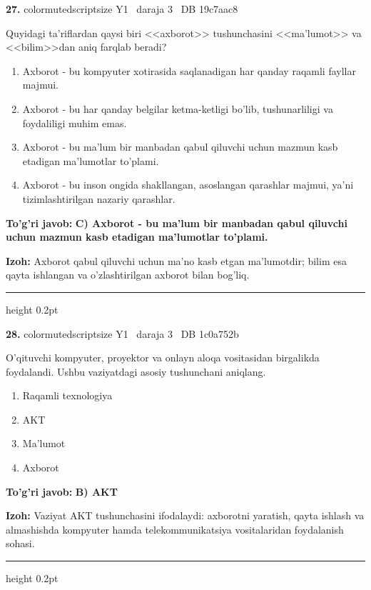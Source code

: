 \documentclass[10pt,a4paper,oneside]{article}
\begin{document}
\noindent\textbf{\color{ink}27.}  {color{muted}scriptsize Y1 \textbullet\ daraja 3 \textbullet\ DB 19c7aac8}
\par
Quyidagi ta'riflardan qaysi biri <<axborot>> tushunchasini <<ma'lumot>> va <<bilim>>dan aniq farqlab beradi?
\begin{enumerate}[label=\Alph*),leftmargin=9mm]
\item Axborot - bu kompyuter xotirasida saqlanadigan har qanday raqamli fayllar majmui.
\item Axborot - bu har qanday belgilar ketma-ketligi bo'lib, tushunarliligi va foydaliligi muhim emas.
\item Axborot - bu ma'lum bir manbadan qabul qiluvchi uchun mazmun kasb etadigan ma'lumotlar to'plami.
\item Axborot - bu inson ongida shakllangan, asoslangan qarashlar majmui, ya'ni tizimlashtirilgan nazariy qarashlar.
\end{enumerate}
\begin{tcolorbox}[enhanced,breakable,colback=teal!4,colframe=teal!50!black,boxrule=0.5pt,arc=1.1mm,left=3mm,right=3mm,top=1.7mm,bottom=1.7mm,before skip=2mm,after skip=2mm]
\textbf{\color{teal}To'g'ri javob:} \textbf{C) Axborot - bu ma'lum bir manbadan qabul qiluvchi uchun mazmun kasb etadigan ma'lumotlar to'plami.}
\par\smallskip
\textbf{Izoh:} Axborot qabul qiluvchi uchun ma'no kasb etgan ma'lumotdir; bilim esa qayta ishlangan va o'zlashtirilgan axborot bilan bog'liq.
\end{tcolorbox}
\vspace{2mm}\hrule height 0.2pt \vspace{3mm}

\noindent\textbf{\color{ink}28.}  {color{muted}scriptsize Y1 \textbullet\ daraja 3 \textbullet\ DB 1c0a752b}
\par
O'qituvchi kompyuter, proyektor va onlayn aloqa vositasidan birgalikda foydalandi. Ushbu vaziyatdagi asosiy tushunchani aniqlang.
\begin{enumerate}[label=\Alph*),leftmargin=9mm]
\item Raqamli texnologiya
\item AKT
\item Ma'lumot
\item Axborot
\end{enumerate}
\begin{tcolorbox}[enhanced,breakable,colback=teal!4,colframe=teal!50!black,boxrule=0.5pt,arc=1.1mm,left=3mm,right=3mm,top=1.7mm,bottom=1.7mm,before skip=2mm,after skip=2mm]
\textbf{\color{teal}To'g'ri javob:} \textbf{B) AKT}
\par\smallskip
\textbf{Izoh:} Vaziyat AKT tushunchasini ifodalaydi: axborotni yaratish, qayta ishlash va almashishda kompyuter hamda telekommunikatsiya vositalaridan foydalanish sohasi.
\end{tcolorbox}
\vspace{2mm}\hrule height 0.2pt \vspace{3mm}
\end{document}
